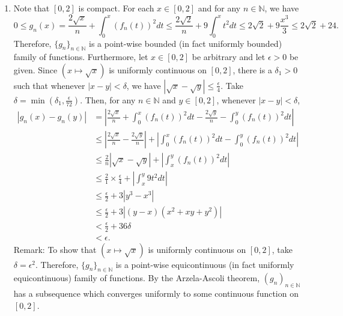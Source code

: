\documentclass{article}
\newcommand{\N}{\mathbb{N}}
\begin{document}
\begin{enumerate}[label=\alph*)]

\item Note that $[0,2]$ is compact. For each $x\in [0,2]$ and for any $n\in\N$, we have 
$$0\leq g_n(x) = \frac{2\sqrt{x}}{n} + \int_0^x (f_n(t))^2 dt \leq 
\frac{2\sqrt{2}}{n} + 9\int_0^x t^2 dt \leq 2\sqrt{2} + 9\frac{x^3}{3} \leq 
2\sqrt{2} + 24.$$ Therefore, $\{g_n\}_{n\in\N}$ is a point-wise bounded (in fact uniformly 
bounded) family of functions. Furthermore, let $x\in[0,2]$ be arbitrary and let $\epsilon>0$ be given. 
Since $(x\mapsto\sqrt{x})$ is uniformly continuous on $[0,2]$, there is a $\delta_1>0$ such that 
whenever $|x-y|<\delta$, we have $|\sqrt{x}-\sqrt{y}|\leq \frac{\epsilon}{4}$.
Take $\delta = \min(\delta_1, \frac{\epsilon}{72})$. Then, for any $n\in\N$ and $y\in [0,2]$, 
whenever $|x-y|<\delta$, 
\begin{align*}
    |g_n(x) - g_n(y)| 
    &= \left| \frac{2\sqrt{x}}{n} + \int_0^x (f_n(t))^2 dt 
    - \frac{2\sqrt{y}}{n} - \int_0^y (f_n(t))^2 dt\right|\\
    &\leq \left| \frac{2\sqrt{x}}{n} - \frac{2\sqrt{y}}{n} \right| 
    + \left| \int_0^x (f_n(t))^2 dt  - \int_0^y (f_n(t))^2 dt\right|\\ 
    &\leq \frac{2}{n}\left| \sqrt{x} - \sqrt{y} \right| 
    + \left|\int_x^y (f_n(t))^2 dt\right|\\ 
    &\leq \frac{2}{1}\times\frac{\epsilon}{4}
    + \left|\int_x^y 9t^2 dt\right|\\ 
    &\leq \frac{\epsilon}{2} 
    + 3\left|y^3-x^3\right|\\ 
    &\leq \frac{\epsilon}{2} 
    + 3\left|(y-x)(x^2+xy+y^2)\right|\\ 
    &< \frac{\epsilon}{2} 
    + 36\delta\\ 
    &< \epsilon. 
\end{align*}
Remark: To show that $(x\mapsto\sqrt{x})$ is uniformly continuous on $[0,2]$, take $\delta=\epsilon^2$. 
Therefore, $\{g_n\}_{n\in\N}$ is a point-wise equicontinuous (in fact uniformly 
equicontinuous) family of functions. By the Arzela-Ascoli theorem, $(g_n)_{n\in\N}$ has a subsequence 
which converges uniformly to some continuous function on $[0,2]$. \\


\end{enumerate}
\end{document}
